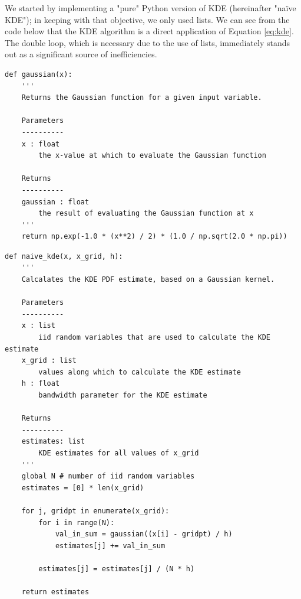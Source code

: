 \documentclass[11pt]{article}
\begin{document}
\noindent We started by implementing a "pure" Python version of KDE (hereinafter "na\"ive KDE"); in keeping with that objective, we only used lists. We can see from the code below that the KDE algorithm is a direct application of Equation \ref{eq:kde}. The double loop, which is necessary due to the use of lists, immediately stands out as a significant source of inefficiencies.

\begin{framed}
\begin{singlespacing}
\begin{scriptsize}
\begin{verbatim}
def gaussian(x):
    '''
    Returns the Gaussian function for a given input variable.
    
    Parameters
    ----------
    x : float
        the x-value at which to evaluate the Gaussian function
        
    Returns
    ----------
    gaussian : float
        the result of evaluating the Gaussian function at x
    '''
    return np.exp(-1.0 * (x**2) / 2) * (1.0 / np.sqrt(2.0 * np.pi))
\end{verbatim}
\end{scriptsize}
\end{singlespacing}
\end{framed}

\newpage

\begin{framed}
\begin{singlespacing}
\begin{scriptsize}
\begin{verbatim}
def naive_kde(x, x_grid, h):
    '''
    Calcalates the KDE PDF estimate, based on a Gaussian kernel.
    
    Parameters
    ----------
    x : list
        iid random variables that are used to calculate the KDE estimate
    x_grid : list
        values along which to calculate the KDE estimate
    h : float
        bandwidth parameter for the KDE estimate
        
    Returns
    ----------
    estimates: list
        KDE estimates for all values of x_grid
    '''
    global N # number of iid random variables
    estimates = [0] * len(x_grid)
    
    for j, gridpt in enumerate(x_grid):
        for i in range(N):
            val_in_sum = gaussian((x[i] - gridpt) / h)
            estimates[j] += val_in_sum
        
        estimates[j] = estimates[j] / (N * h)
    
    return estimates
\end{verbatim}
\end{scriptsize}
\end{singlespacing}
\end{framed}
\end{document}
